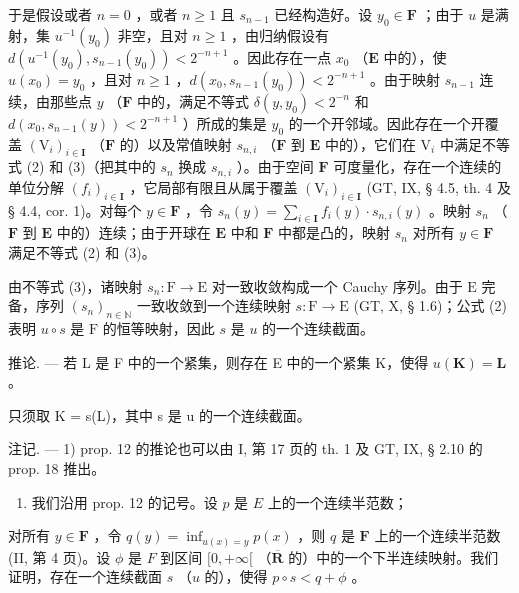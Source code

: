 于是假设或者 \(n = 0\) ，或者 \(n \geqslant 1\) 且 \(s_{n-1}\) 已经构造好。设 \(y_0 \in \mathbf{F}\) ；由于 \(u\) 是满射，集 \(u^{-1}(y_0)\) 非空，且对 \(n \geqslant 1\) ，由归纳假设有 \(d(u^{-1}(y_0), s_{n-1}(y_0)) < 2^{-n+1}\) 。因此存在一点 \(x_0\) （\(\mathbf{E}\) 中的），使 \(u(x_0) = y_0\) ，且对 \(n \geqslant 1\) ，\(d(x_0, s_{n-1}(y_0)) < 2^{-n+1}\) 。由于映射 \(s_{n-1}\) 连续，由那些点 \(y\) （\(\mathbf{F}\) 中的，满足不等式 \(\delta(y, y_0) < 2^{-n}\) 和 \(d(x_0, s_{n-1}(y)) < 2^{-n+1}\) ）所成的集是 \(y_0\) 的一个开邻域。因此存在一个开覆盖 \((\mathrm{V}_i)_{i \in \mathbf{I}}\) （\(\mathbf{F}\) 的）以及常值映射 \(s_{n,i}\) （\(\mathbf{F}\) 到 \(\mathbf{E}\) 中的），它们在 \(\mathrm{V}_i\) 中满足不等式 (2) 和 (3)（把其中的 \(s_n\) 换成 \(s_{n,i}\) ）。由于空间 \(\mathbf{F}\) 可度量化，存在一个连续的单位分解 \((f_i)_{i \in \mathbf{I}}\) ，它局部有限且从属于覆盖 \((\mathrm{V}_i)_{i \in \mathbf{I}}\) (GT, IX, § 4.5, th. 4 及 § 4.4, cor. 1)。对每个 \(y \in \mathbf{F}\) ，令 \(s_n(y) = \sum_{i \in \mathbf{I}} f_i(y) \cdot s_{n,i}(y)\) 。映射 \(s_n\) （\(\mathbf{F}\) 到 \(\mathbf{E}\) 中的）连续；由于开球在 \(\mathbf{E}\) 中和 \(\mathbf{F}\) 中都是凸的，映射 \(s_n\) 对所有 \(y \in \mathbf{F}\) 满足不等式 (2) 和 (3)。

由不等式 (3)，诸映射 \(s_n: \mathrm{F} \to \mathrm{E}\) 对一致收敛构成一个 Cauchy 序列。由于 \(\mathrm{E}\) 完备，序列 \((s_n)_{n \in \mathbb{N}}\) 一致收敛到一个连续映射 \(s: \mathrm{F} \to \mathrm{E}\) (GT, X, § 1.6)；公式 (2) 表明 \(u \circ s\) 是 \(\mathrm{F}\) 的恒等映射，因此 \(s\) 是 \(u\) 的一个连续截面。

推论. --- 若 L 是 F 中的一个紧集，则存在 E 中的一个紧集 K，使得 \(u(\mathbf{K}) = \mathbf{L}\) 。

只须取 K = s(L)，其中 s 是 u 的一个连续截面。

注记. --- 1) prop. 12 的推论也可以由 I, 第 17 页的 th. 1 及 GT, IX, § 2.10 的 prop. 18 推出。

\begin{enumerate}
\def\labelenumi{\arabic{enumi})}
\setcounter{enumi}{1}
\tightlist
\item
  我们沿用 prop. 12 的记号。设 \(p\) 是 \(E\) 上的一个连续半范数；
\end{enumerate}

对所有 \(y \in \mathbf{F}\) ，令 \(q(y) = \inf_{u(x) = y} p(x)\) ，则 \(q\) 是 \(\mathbf{F}\) 上的一个连续半范数 (II, 第 4 页)。设 \(\phi\) 是 \(F\) 到区间 \([0, +\infty[\) （\(\overline{\mathbf{R}}\) 的）中的一个下半连续映射。我们证明，存在一个连续截面 \(s\) （\(u\) 的），使得 \(p \circ s < q + \phi\) 。

